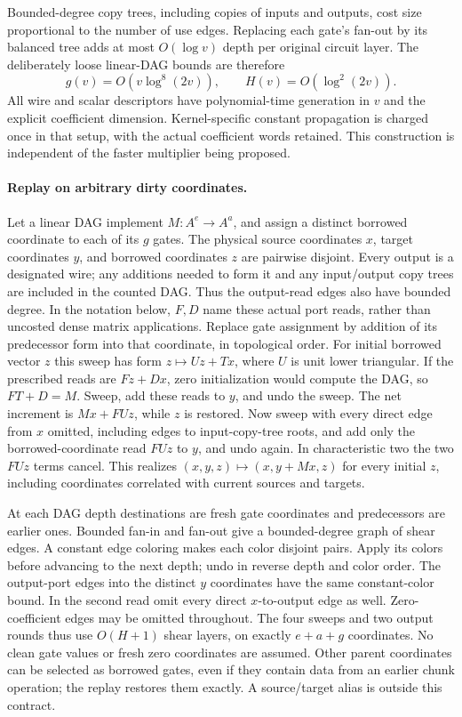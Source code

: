 Bounded-degree copy trees, including copies of inputs and outputs,
cost size proportional to the number of use edges. Replacing each
gate's fan-out by its balanced tree adds at most $O(\log v)$ depth
per original circuit layer. The deliberately loose linear-DAG bounds
are therefore
\[
 g(v)=O(v\log^8(2v)),\qquad H(v)=O(\log^2(2v)).
\]
All wire and scalar descriptors have polynomial-time generation in
$v$ and the explicit coefficient dimension. Kernel-specific constant
propagation is charged once in that setup, with the actual coefficient
words retained. This construction is
independent of the faster multiplier being proposed.

\paragraph{Replay on arbitrary dirty coordinates.}
Let a linear DAG implement $M:A^e\to A^a$, and assign a distinct
borrowed coordinate to each of its $g$ gates. The physical source
coordinates $x$, target coordinates $y$, and borrowed coordinates $z$
are pairwise disjoint. Every output is a designated wire; any additions
needed to form it and any input/output copy trees are included in the
counted DAG. Thus the output-read edges also have bounded degree.
In the notation below, $F,D$ name these actual port reads, rather than
uncosted dense matrix applications.
Replace gate assignment
by addition of its predecessor form into that coordinate, in
topological order. For initial borrowed vector $z$ this sweep has
form $z\mapsto Uz+Tx$, where $U$ is unit lower triangular.
If the prescribed reads are $Fz+Dx$, zero initialization would compute
the DAG, so $FT+D=M$.
Sweep, add these reads to $y$, and undo the sweep. The net increment
is $Mx+FUz$, while $z$ is restored. Now sweep with every direct edge
from $x$ omitted, including edges to input-copy-tree roots, and add
only the borrowed-coordinate read $FUz$ to $y$,
and undo again. In characteristic two the two $FUz$ terms cancel.
This realizes $(x,y,z)\mapsto(x,y+Mx,z)$ for every initial $z$,
including coordinates correlated with current sources and targets.

At each DAG depth destinations are fresh gate coordinates and
predecessors are earlier ones. Bounded fan-in and fan-out give a
bounded-degree graph of shear edges. A constant edge coloring makes
each color disjoint pairs. Apply its colors before advancing to the
next depth; undo in reverse depth and color order. The output-port
edges into the distinct $y$ coordinates have the same constant-color
bound. In the second read omit every direct $x$-to-output edge as well.
Zero-coefficient edges may be omitted throughout.
The four sweeps and two output rounds
thus use $O(H+1)$ shear layers, on exactly $e+a+g$ coordinates.
No clean gate values or fresh zero coordinates are assumed.
Other parent coordinates can be selected as borrowed gates, even if
they contain data from an earlier chunk operation; the replay restores
them exactly. A source/target alias is outside this contract.

